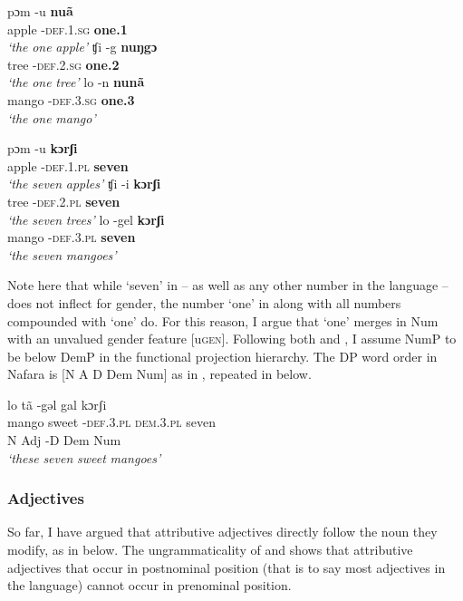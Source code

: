 \documentclass[output=paper]{langscibook}
\begin{document}
\ea\label{ex:baron:6}
\ea
\gll pɔm   -u   \textbf{nuã} \\
apple -\textsc{def.1.sg}   \textbf{one.1}   \\
\glt \textit{‘the} \textit{one} \textit{apple’}
\ex
\gll ʧi   -g   \textbf{nuŋgɔ}   \\
tree -\textsc{def.2.sg}    \textbf{one.2}     \\
\glt \textit{‘the} \textit{one} \textit{tree’}
\ex
\gll lo   -n   \textbf{nunã}\\
mango -\textsc{def.3.sg}    \textbf{one.3}\\
\glt \textit{‘the} \textit{one} \textit{mango’}    
\z
\z

\ea\label{ex:baron:7}
\ea
\gll pɔm -u \textbf{kɔrʃi}   \\
apple -\textsc{def.1.pl} \textbf{seven}     \\
\glt \textit{‘the} \textit{seven} \textit{apples’}
\ex
\gll ʧi -i \textbf{kɔrʃi}           \\
tree -\textsc{def.2.pl} \textbf{seven}  \\
\glt \textit{‘the} \textit{seven} \textit{trees’}
\ex
\gll lo -gel \textbf{kɔrʃi}\\
mango -\textsc{def.3.pl} \textbf{seven}\\
\glt \textit{‘t}\textit{he} \textit{seven} \textit{mangoes’}
\z
\z

Note here that while ‘seven’ in  – as well as any other number in the language – does not inflect for gender, the number ‘one’ in  along with all numbers compounded with ‘one’ do. For this reason, I argue that ‘one’ merges in Num with an unvalued gender feature [u\textsc{gen}]. Following both \citet{Greenberg1963} and \citet{Cinque2005}, I assume NumP to be below DemP in the functional projection hierarchy. The DP word order in Nafara is [N A D Dem Num] as in , repeated in  below.

 
\ea\label{ex:baron:8}
\glll lo  tã -gəl  gal  kɔrʃi\\
mango sweet -\textsc{def.3.pl} \textsc{dem.3.pl} seven\\
N  Adj  -D  Dem  Num\\
\glt \textit{‘these} \textit{seven} \textit{sweet} \textit{mangoes’}
\z


\subsubsection{Adjectives}
\label{sec:baron:2.1.5}
So far, I have argued that attributive adjectives directly follow the noun they modify, as in  below. The ungrammaticality of  and  shows that attributive adjectives that occur in postnominal position (that is to say most adjectives in the language) cannot occur in prenominal position.
 
\end{document}

